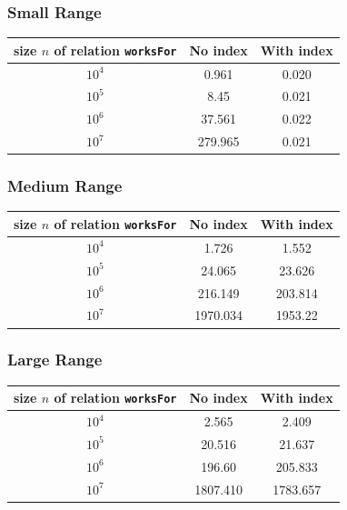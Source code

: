 \documentclass{article}
\begin{document}
    \subsubsection*{Small Range}
    \begin{center}
      {\normalsize
        \begin{tabular}{c|c|c}
        size $n$ of relation {\tt worksFor} & No index & With index \\ \hline
        $10^4$ & 0.961 & 0.020 \\
        $10^5$ & 8.45 & 0.021 \\
        $10^6$ & 37.561 & 0.022 \\
        $10^7$ & 279.965 & 0.021\\
        \end{tabular}
      }
      \end{center}

      \subsubsection*{Medium Range}
      \begin{center}
        {\normalsize
          \begin{tabular}{c|c|c}
          size $n$ of relation {\tt worksFor} & No index & With index \\ \hline
          $10^4$ & 1.726 & 1.552\\
          $10^5$ & 24.065 & 23.626\\
          $10^6$ & 216.149 &  203.814\\
          $10^7$ & 1970.034 & 1953.22\\
          \end{tabular}
        }
        \end{center}
    
        \subsubsection*{Large Range}
    \begin{center}
      {\normalsize
        \begin{tabular}{c|c|c}
        size $n$ of relation {\tt worksFor} & No index & With index \\ \hline
        $10^4$ & 2.565 & 2.409\\
        $10^5$ & 20.516 & 21.637\\
        $10^6$ & 196.60 &  205.833\\
        $10^7$ & 1807.410 & 1783.657\\
        \end{tabular}
      }
      \end{center}
\end{document}
